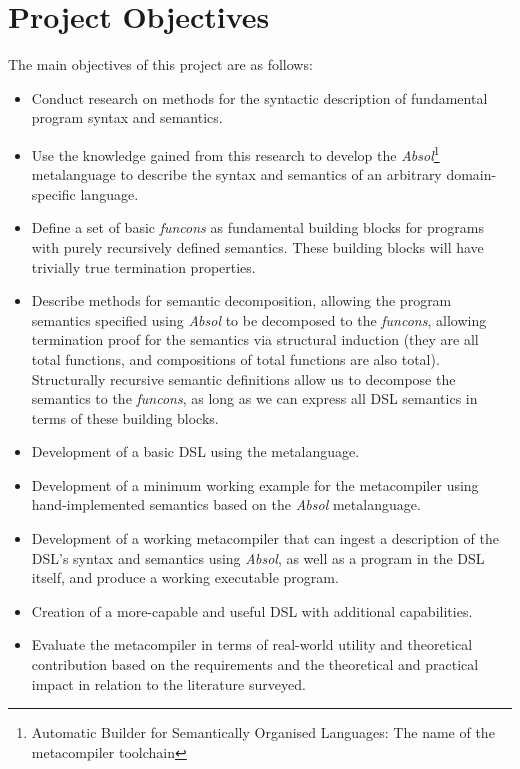 \section{Project Objectives} %
\label{sec:project_objectives}
The main objectives of this project are as follows:
\begin{itemize}
    \item Conduct research on methods for the syntactic description of fundamental program syntax and semantics.
    \item Use the knowledge gained from this research to develop the \textit{Absol}\footnote{Automatic Builder for Semantically Organised Languages: The name of the metacompiler toolchain} metalanguage to describe the syntax and semantics of an arbitrary domain-specific language.
    \item Define a set of basic \textit{funcons} as fundamental building blocks for programs with purely recursively defined semantics. 
    These building blocks will have trivially true termination properties.
    \item Describe methods for semantic decomposition, allowing the program semantics specified using \textit{Absol} to be decomposed to the \textit{funcons}, allowing termination proof for the semantics via structural induction (they are all total functions, and compositions of total functions are also total).
    Structurally recursive semantic definitions allow us to decompose the semantics to the \textit{funcons}, as long as we can express all DSL semantics in terms of these building blocks. 
    \item Development of a basic DSL using the metalanguage.
    \item Development of a minimum working example for the metacompiler using hand-implemented semantics based on the \textit{Absol} metalanguage.
    \item Development of a working metacompiler that can ingest a description of the DSL's syntax and semantics using \textit{Absol}, as well as a program in the DSL itself, and produce a working executable program.
    \item Creation of a more-capable and useful DSL with additional capabilities.
    \item Evaluate the metacompiler in terms of real-world utility and theoretical contribution based on the requirements and the theoretical and practical impact in relation to the literature surveyed.
\end{itemize}




